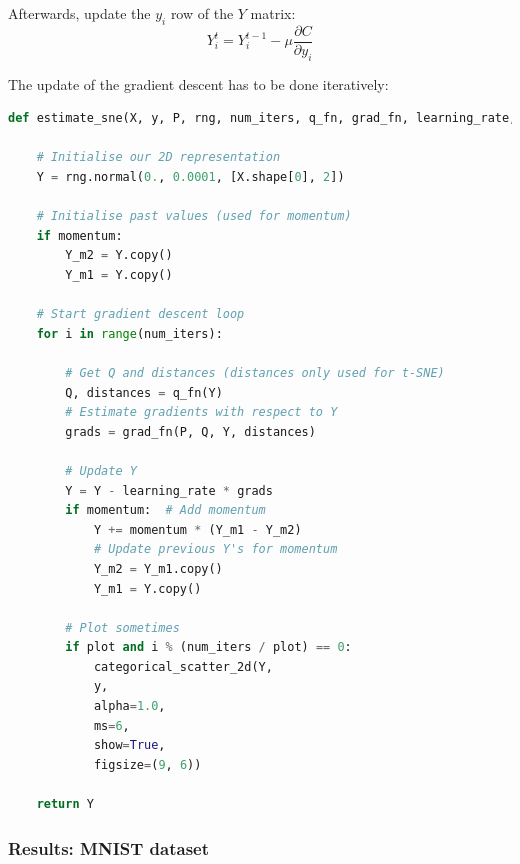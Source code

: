 Afterwards, update the $y_i$ row of the $Y$ matrix:
$$Y^t_i = Y_i^{t-1} - \mu \frac{\partial C}{\partial y_i}$$

The update of the gradient descent has to be done iteratively:

\begin{lstlisting}[language=Python]
def estimate_sne(X, y, P, rng, num_iters, q_fn, grad_fn, learning_rate, momentum, plot):

    # Initialise our 2D representation
    Y = rng.normal(0., 0.0001, [X.shape[0], 2])

    # Initialise past values (used for momentum)
    if momentum:
        Y_m2 = Y.copy()
        Y_m1 = Y.copy()

    # Start gradient descent loop
    for i in range(num_iters):

        # Get Q and distances (distances only used for t-SNE)
        Q, distances = q_fn(Y)
        # Estimate gradients with respect to Y
        grads = grad_fn(P, Q, Y, distances)

        # Update Y
        Y = Y - learning_rate * grads
        if momentum:  # Add momentum
            Y += momentum * (Y_m1 - Y_m2)
            # Update previous Y's for momentum
            Y_m2 = Y_m1.copy()
            Y_m1 = Y.copy()

        # Plot sometimes
        if plot and i % (num_iters / plot) == 0:
            categorical_scatter_2d(Y,
            y,
            alpha=1.0,
            ms=6,
            show=True,
            figsize=(9, 6))

    return Y
\end{lstlisting}

\newpage
\subsubsection{Results: MNIST dataset}

